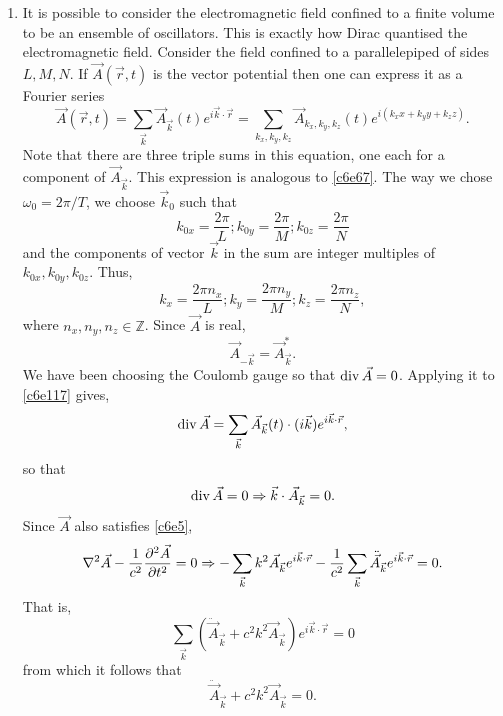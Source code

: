 \begin{enumerate}
\item It is possible to consider the electromagnetic field confined to a finite
volume to be an ensemble of oscillators. This is exactly how Dirac quantised the
electromagnetic field. Consider the field confined to a parallelepiped of sides
$L, M, N$. If $\vec{A}(\vec{r}, t)$ is the vector potential then one can express it
as a Fourier series
\begin{equation}\label{c6e117}
\vec{A}(\vec{r}, t) = \sum_{\vec{k}}\vec{A}_{\vec{k}}(t) 
e^{i\vec{k}\cdot\vec{r}} =
\sum_{k_x, k_y, k_z}\vec{A}_{k_x,k_y,k_z}(t) e^{i(k_xx + k_yy + k_zz)}.
\end{equation}
Note that there are three triple sums in this equation, one each for a component
of $\vec{A}_{\vec{k}}$. This expression is analogous to \eqref{c6e67}. The way we 
chose $\omega_0 = 2\pi/T$, we choose $\vec{k}_0$ such that
\begin{equation}\label{c6e118}
k_{0x} = \frac{2\pi}{L}; k_{0y} = \frac{2\pi}{M}; k_{0z} = \frac{2\pi}{N}
\end{equation}
and the components of vector $\vec{k}$ in the sum are integer multiples of 
$k_{0x}, k_{0y}, k_{0z}$. Thus,
\begin{equation}\label{c6e119}
k_{x} = \frac{2\pi n_x}{L}; k_{y} = \frac{2\pi n_y}{M}; k_{z} = \frac{2\pi n_z}{N},
\end{equation}
where $n_x, n_y, n_z \in \mathbb{Z}$. Since $\vec{A}$ is real,
\begin{equation}\label{c6e120}
\vec{A}_{-\vec{k}} = \vec{A}^\ast_{\vec{k}}.
\end{equation}
We have been choosing the Coulomb gauge so that $\operatorname{div}\vec{A} = 0$. Applying it
to \eqref{c6e117} gives,
\[
\operatorname{div}\vec{A} = \sum_{\vec{k}}\vec{A}_{\vec{k}}(t)\cdot(i\vec{k})e^{i\vec{k}\cdot\vec{r}},
\]
so that
\begin{equation}\label{c6e121}
\operatorname{div}\vec{A} = 0 \Rightarrow \vec{k}\cdot\vec{A}_{\vec{k}} = 0.
\end{equation}
Since $\vec{A}$ also satisfies \eqref{c6e5},
\[
\nabla^2\vec{A} - \frac{1}{c^2}\frac{\partial^2{\vec{A}}}{\partial{t}^2} = 0 \Rightarrow
-\sum_{\vec{k}}k^2\vec{A}_{\vec{k}}e^{i\vec{k}\cdot\vec{r}} - 
\frac{1}{c^2}\sum_{\vec{k}}\ddot{\vec{A}}_{\vec{k}}e^{i\vec{k}\cdot\vec{r}} = 0.
\]
That is,
\[
\sum_{\vec{k}}\left(\ddot{\vec{A}}_{\vec{k}} + c^2k^2\vec{A}_{\vec{k}}\right)e^{i\vec{k}\cdot\vec{r}} = 0
\]
from which it follows that
\begin{equation}\label{c6e122}
\ddot{\vec{A}}_{\vec{k}} + c^2k^2\vec{A}_{\vec{k}} = 0.
\end{equation}

\end{enumerate}
